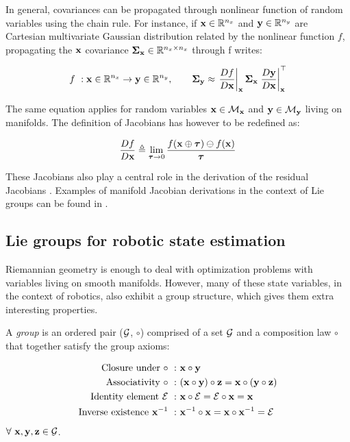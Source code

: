 In general, covariances can be propagated through nonlinear function of random variables using the chain rule. For instance, if ${\bf x} \in \mathbb{R}^{n_x}$ and 
${\bf y} \in \mathbb{R}^{n_y}$ are Cartesian multivariate Gaussian distribution related by the nonlinear function $f$, propagating the ${\bf x}$ covariance 
${\bm \Sigma}_{{\bf x}} \in \mathbb{R}^{n_x \times n_x}$ through f writes:

\begin{equation}
    f~: {\bf x} \in \mathbb{R}^{n_x} \rightarrow {\bf y} \in \mathbb{R}^{n_y}, \quad \quad {\bm \Sigma}_{{\bf y}} \approx 
                \left.\frac{D f}{D {\bf x}} \right|_{{\bf x}}   {\bm \Sigma}_{{\bf x}}    \left.\frac{D {\bf y}}{D {\bf x}}\right|_{{\bf x}}^{\top}
    \label{eq:cov_propagation}
\end{equation}

The same equation applies for random variables ${\bf x} \in \mathcal{M}_{{\bf x}}$ and ${\bf y} \in \mathcal{M}_{{\bf y}}$ living on manifolds. The definition of Jacobians has however
to be redefined as:

\begin{equation}
    \frac{D f}{D {\bf x}} \triangleq \lim_{{\bm \tau} \to 0} \frac{f({\bf x} \oplus {\bm \tau}) \ominus f({\bf x})}{{\bm \tau}}
\end{equation}

These Jacobians also play a central role in the derivation of the residual Jacobians .
Examples of manifold Jacobian derivations in the context of Lie groups can be found in \cite{sola2018micro}.  



\subsection{Lie groups for robotic state estimation}
\label{sec:lie_groups}
Riemannian geometry is enough to deal with optimization problems with variables living on smooth manifolds. However, many of these state variables, 
in the context of robotics, also exhibit a group structure, which gives them extra interesting properties.

A \textit{group} is an ordered pair ($\mathcal{G}$, $\circ$) comprised of a set $\mathcal{G}$ and a composition law $\circ$ that together satisfy the group axioms:

\begin{align}
    \text{Closure under}~\circ~:&~{\bf x} \circ {\bf y} \\ 
    \text{Associativity}~\circ~:&~({\bf x} \circ {\bf y}) \circ {\bf z} = {\bf x} \circ ({\bf y} \circ {\bf z}) \\ 
    \text{Identity element}~\mathcal{E}~:&~{\bf x} \circ \mathcal{E} = \mathcal{E} \circ {\bf x} = {\bf x} \\ 
    \text{Inverse existence}~{\bf x}^{-1}~:&~{\bf x}^{-1} \circ {\bf x} = {\bf x} \circ {\bf x}^{-1} = \mathcal{E}
\end{align}
$\forall~{\bf x},{\bf y},{\bf z} \in \mathcal{G}$.

